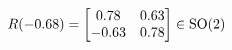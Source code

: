 \documentclass[preview]{standalone}
\begin{document}
\begin{align*}
\special{dvisvgm:raw <g id='unique000'>}R(-0.68) = \begin{bmatrix} 0.78 & 0.63 \\ -0.63 & 0.78 \end{bmatrix} \in \text{SO}(2)\special{dvisvgm:raw </g>}
\end{align*}
\end{document}
